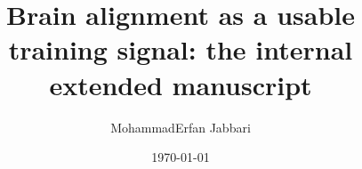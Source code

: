 \documentclass[11pt]{article}
\title{Brain alignment as a usable training signal: the internal extended manuscript}
\author{MohammadErfan Jabbari}
\date{\today}
\begin{document}
\maketitle
\begin{abstract}
\end{abstract}
\tableofcontents

% 
% 
% 
% 
% 
% 
% 

% 

\printbibliography
\end{document}
